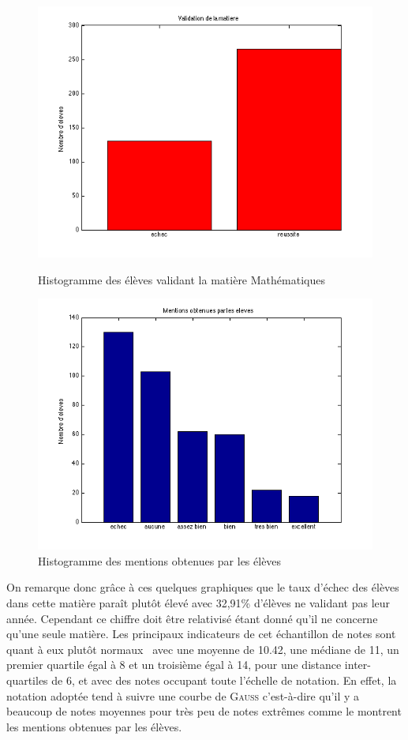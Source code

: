 \documentclass[11pt]{article}
\begin{document}
\begin{figure}[h]
\centering
\includegraphics[scale=0.5]{Images/fig3.png}
\caption{Histogramme des élèves validant la matière Mathématiques}

\includegraphics[scale=0.5]{Images/fig4.png}
\caption{Histogramme des mentions obtenues par les élèves}
\end{figure}

\FloatBarrier
On remarque donc grâce à ces quelques graphiques que le taux d'échec des élèves dans cette matière paraît plutôt élevé avec 32,91\% d'élèves ne validant pas leur année. Cependant ce chiffre doit être relativisé étant donné qu'il ne concerne qu'une seule matière. Les principaux indicateurs de cet échantillon de notes sont quant à eux plutôt \og normaux \fg{} avec une moyenne de 10.42, une médiane de 11, un premier quartile égal à 8 et un troisième égal à 14, pour une distance inter-quartiles de 6, et avec des notes occupant toute l'échelle de notation. En effet, la notation adoptée tend à suivre une courbe de \textsc{Gauss} c'est-à-dire qu'il y a beaucoup de notes moyennes pour très peu de notes extrêmes comme le montrent les mentions obtenues par les élèves.
\end{document}
